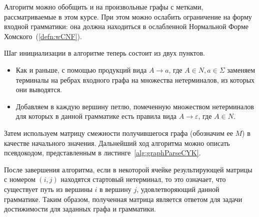 Алгоритм можно обобщить и на произвольные графы с метками, рассматриваемые в этом курсе.
При этом можно ослабить ограничение на форму входной грамматики: она должна находиться в ослабленной Нормальной Форме Хомского~(\ref{defn:wCNF}).

Шаг инициализации в алгоритме теперь состоит из двух пунктов.
\begin{itemize}
    \item Как и раньше, с помощью продукций вида $A \to a$, где $A \in N, a \in \Sigma$ заменяем терминалы на ребрах входного графа на множества нетерминалов, из которых они выводятся.
    \item Добавляем в каждую вершину петлю, помеченную множеством нетерминалов для которых в данной грамматике есть правила вида $A \to \varepsilon$, где $A \in N$.
\end{itemize}

Затем используем матрицу смежности получившегося графа (обозначим ее $M$) в качестве начального значения.
Дальнейший ход алгоритма можно описать псевдокодом, представленным в листинге~\ref{alg:graphParseCYK}.



После завершения алгоритма, если в некоторой ячейке результирующей матрицы с номером $(i, j)$ находятся стартовый нетерминал, то это означает, что существует путь из вершины $i$ в вершину $j$, удовлетворяющий данной грамматике.
Таким образом, полученная матрица является ответом для задачи достижимости для заданных графа и грамматики.

